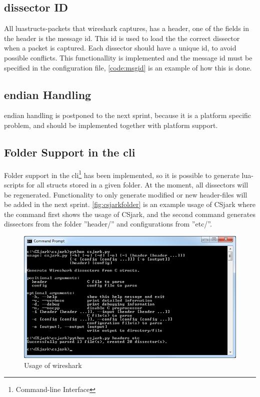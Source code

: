 \subsection{\Gls{dissector} ID}
All luastructs-\glspl{packet} that \Gls{wireshark} captures, has a \gls{header}, one of the fields in 
the \gls{header} is the message id. This id is used to load the the correct 
\gls{dissector} when a \gls{packet} is captured. Each \gls{dissector} should have a unique id, 
to avoid possible conflicts. This functionallity is implemented and the 
message id must be specified in the configuration file, \autoref{code:msgid} 
is an example of how this is done.



\subsection{\Gls{endian} Handling}
\Gls{endian} handling is postponed to the next sprint, because it is a platform 
specific problem, and should be implemented together with platform support.

\subsection{Folder Support in the \gls{cli}}
Folder support in the \gls{cli}\footnote{Command-line Interface} has been 
implemented, so it is possible to generate \Gls{lua}-\glspl{script} for all \glspl{struct} stored 
in a given folder. At the moment, all \glspl{dissector} will be regenerated. 
Functionality to only generate modified or new \gls{header}-files will be added in 
the next sprint. \autoref{fig:csjarkfolder} is an example usage of CSjark where
the command first shows the usage of CSjark, and the second command 
generates \glspl{dissector} from the folder ''\gls{header}/'' and configurations from ''etc/''.

\begin{figure}[ht]
	\center
	\includegraphics[width=\textwidth]{./sprints/img/csjark_folder}
	\caption{Usage of \Gls{wireshark}\label{fig:csjarkfolder}}
\end{figure}

